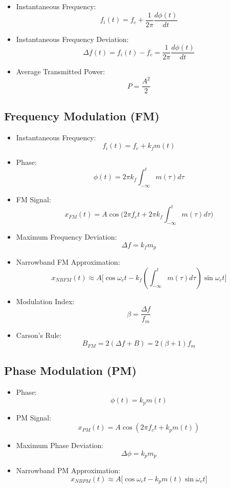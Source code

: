 \documentclass[12pt]{AnantDocumentatioe}
\begin{document}
\begin{itemize}
    \item Instantaneous Frequency:
    \[
        f_i(t) = f_c + \frac{1}{2\pi} \frac{d\phi(t)}{dt}
    \]
    \item Instantaneous Frequency Deviation:
    \[
        \Delta f(t) = f_i(t) - f_c = \frac{1}{2\pi} \frac{d\phi(t)}{dt}
    \]
    \item Average Transmitted Power:
    \[
        P = \frac{A^2}{2}
    \]
\end{itemize}

\subsection{Frequency Modulation (FM)}

\begin{itemize}
    \item Instantaneous Frequency:
    \[
        f_i(t) = f_c + k_f m(t)
    \]
    \item Phase:
    \[
        \phi(t) = 2\pi k_f \int_{-\infty}^{t} m(\tau) d\tau
    \]
    \item FM Signal:
    \[
        x_{FM}(t) = A \cos \Big( 2\pi f_c t + 2\pi k_f \int_{-\infty}^{t} m(\tau) d\tau \Big)
    \]
    \item Maximum Frequency Deviation:
    \[
        \Delta f = k_f m_p
    \]
    \item Narrowband FM Approximation:
    \[
        x_{NBFM}(t) \approx A \big[\cos \omega_c t - k_f (\int_{-\infty}^{t} m(\tau) d\tau) \sin \omega_c t \big]
    \]
    \item Modulation Index:
    \[
        \beta = \frac{\Delta f}{f_m}
    \]
    \item Carson's Rule:
    \[
        B_{FM} = 2(\Delta f + B) = 2(\beta + 1) f_m
    \]
\end{itemize}

\subsection{Phase Modulation (PM)}

\begin{itemize}
    \item Phase:
    \[
        \phi(t) = k_p m(t)
    \]
    \item PM Signal:
    \[
        x_{PM}(t) = A \cos(2\pi f_c t + k_p m(t))
    \]
    \item Maximum Phase Deviation:
    \[
        \Delta \phi = k_p m_p
    \]
    \item Narrowband PM Approximation:
    \[
        x_{NBPM}(t) \approx A \big[ \cos \omega_c t - k_p m(t) \sin \omega_c t \big]
    \]
\end{itemize}
\end{document}
